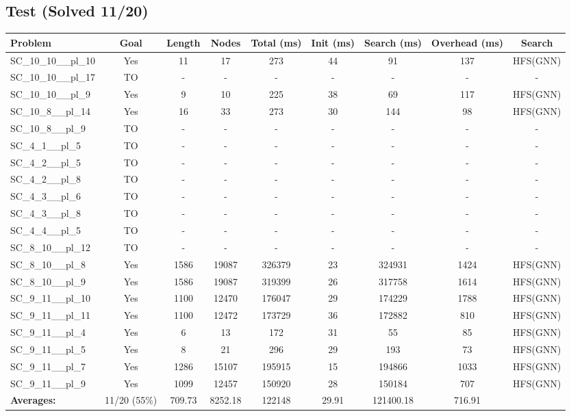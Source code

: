 \documentclass{article}
\begin{document}
\subsection*{Test (Solved 11/20)}
\begin{tabular}{lcccccccc}
\toprule
Problem & Goal & Length & Nodes & Total (ms) & Init (ms) & Search (ms) & Overhead (ms) & Search \\
\midrule
SC\_10\_10\_\_pl\_10 & Yes & 11 & 17 & 273 & 44 & 91 & 137 & HFS(GNN) \\
SC\_10\_10\_\_pl\_17 & TO & - & - & - & - & - & - & - \\
SC\_10\_10\_\_pl\_9 & Yes & 9 & 10 & 225 & 38 & 69 & 117 & HFS(GNN) \\
SC\_10\_8\_\_pl\_14 & Yes & 16 & 33 & 273 & 30 & 144 & 98 & HFS(GNN) \\
SC\_10\_8\_\_pl\_9 & TO & - & - & - & - & - & - & - \\
SC\_4\_1\_\_pl\_5 & TO & - & - & - & - & - & - & - \\
SC\_4\_2\_\_pl\_5 & TO & - & - & - & - & - & - & - \\
SC\_4\_2\_\_pl\_8 & TO & - & - & - & - & - & - & - \\
SC\_4\_3\_\_pl\_6 & TO & - & - & - & - & - & - & - \\
SC\_4\_3\_\_pl\_8 & TO & - & - & - & - & - & - & - \\
SC\_4\_4\_\_pl\_5 & TO & - & - & - & - & - & - & - \\
SC\_8\_10\_\_pl\_12 & TO & - & - & - & - & - & - & - \\
SC\_8\_10\_\_pl\_8 & Yes & 1586 & 19087 & 326379 & 23 & 324931 & 1424 & HFS(GNN) \\
SC\_8\_10\_\_pl\_9 & Yes & 1586 & 19087 & 319399 & 26 & 317758 & 1614 & HFS(GNN) \\
SC\_9\_11\_\_pl\_10 & Yes & 1100 & 12470 & 176047 & 29 & 174229 & 1788 & HFS(GNN) \\
SC\_9\_11\_\_pl\_11 & Yes & 1100 & 12472 & 173729 & 36 & 172882 & 810 & HFS(GNN) \\
SC\_9\_11\_\_pl\_4 & Yes & 6 & 13 & 172 & 31 & 55 & 85 & HFS(GNN) \\
SC\_9\_11\_\_pl\_5 & Yes & 8 & 21 & 296 & 29 & 193 & 73 & HFS(GNN) \\
SC\_9\_11\_\_pl\_7 & Yes & 1286 & 15107 & 195915 & 15 & 194866 & 1033 & HFS(GNN) \\
SC\_9\_11\_\_pl\_9 & Yes & 1099 & 12457 & 150920 & 28 & 150184 & 707 & HFS(GNN) \\
\textbf{Averages:} & 11/20 (55\%) & 709.73 & 8252.18 & 122148 & 29.91 & 121400.18 & 716.91 & \\
\bottomrule
\end{tabular}
\\[0.7cm]
\end{document}
